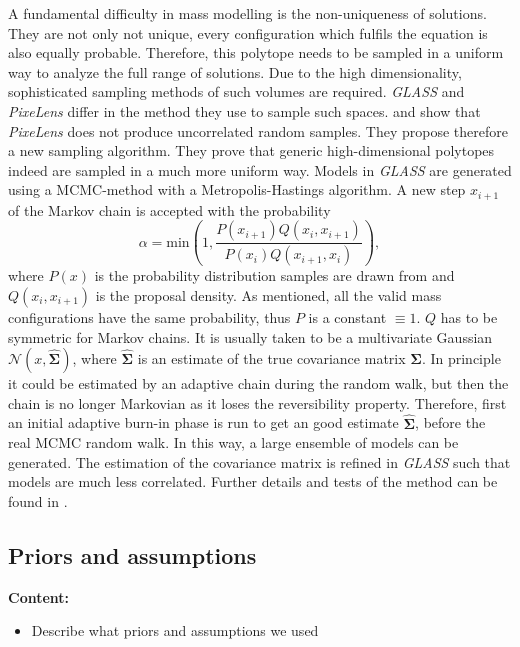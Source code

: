 \documentclass[useAMS,usenatbib]{mn2e}
\begin{document}
A fundamental difficulty in mass modelling is the non-uniqueness of solutions. They are not only not unique, every configuration which fulfils the equation is also equally probable. Therefore, this polytope needs to be sampled in a uniform way to analyze the full range of solutions. Due to the high dimensionality, sophisticated sampling methods of such volumes are required. \textit{GLASS} and \textit{PixeLens} differ in the method they use to sample such spaces. \cite{2008ApJ...679...17C} and \cite{2012MNRAS.425.3077L} show that \textit{PixeLens} does not produce uncorrelated random samples. They propose therefore a new sampling algorithm. They prove that generic high-dimensional polytopes indeed are sampled in a much more uniform way. Models in \textit{GLASS} are generated using a MCMC-method with a Metropolis-Hastings algorithm. A new step $x_{i+1}$ of the Markov chain is accepted with the probability
\begin{equation}
 \alpha = \mathrm{min}\left(1,\frac{P(x_{i+1})Q(x_{i},x_{i+1})}{P(x_{i})Q(x_{i+1},x_{i})}\right),
\end{equation}
where $P(x)$ is the probability distribution samples are drawn from and $Q(x_{i},x_{i+1})$ is the proposal density. As mentioned, all the valid mass configurations have the same probability, thus $P$ is a constant $\equiv1$. $Q$ has to be symmetric for Markov chains. It is usually taken to be a multivariate Gaussian $\mathcal{N}(x,\hat{\boldsymbol\Sigma})$, where $\hat{\boldsymbol\Sigma}$ is an estimate of the true covariance matrix $\boldsymbol\Sigma$. In principle it could be estimated by an adaptive chain during the random walk, but then the chain is no longer Markovian as it loses the reversibility property. Therefore, first an initial adaptive burn-in phase is run to get an good estimate $\hat{\boldsymbol\Sigma}$, before the real MCMC random walk. In this way, a large ensemble of models can be generated. The estimation of the covariance matrix is refined in \textit{GLASS} such that models are much less correlated. Further details and tests of the method can be found in \cite{2012MNRAS.425.3077L}.

\subsection{Priors and assumptions}
\textbf{Content:}
\begin{itemize}
\item Describe what priors and assumptions we used
\end{itemize}
\end{document}
